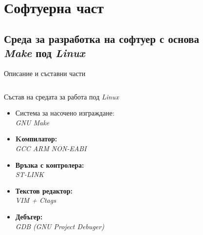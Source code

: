 \documentclass[handout]{beamer}
\begin{document}

\section{Софтуерна част}

\subsection{Среда за разработка на софтуер с основа\\\textit{Make} под \textit{Linux}}


\begin{frame}{Описание и съставни части}
	\begin{columns}
		\begin{block}{ Състав на средата за работа под \textit{Linux}}
			\begin{itemize}
				\pause
				\item Система за насочено изграждане: \\ \textit{GNU Make}

				\pause
				\item \textbf{Kомпилатор:} \\ \textit{GCC ARM NON-EABI}

				\pause
				\item \textbf{Връзка с контролера:} \\ \textit{ST-LINK}

				\pause
				\item \textbf{Текстов редактор:} \\\textit{VIM + Ctags}

				\pause 
				\item \textbf{Дебъгер:} \\ \textit{GDB (GNU Project Debuger)} 


\end{itemize}
\end{block}
\end{columns}
\end{frame}
\end{document}
